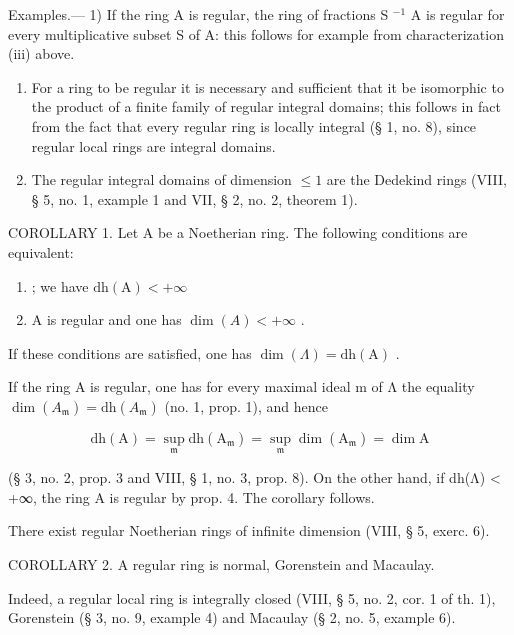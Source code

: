 Examples.--- 1) If the ring A is regular, the ring of fractions S \(^{-1}\) A is regular for every multiplicative subset S of A: this follows for example from characterization (iii) above.

\begin{enumerate}
\def\labelenumi{\arabic{enumi})}
\setcounter{enumi}{1}
\item
  For a ring to be regular it is necessary and sufficient that it be isomorphic to the product of a finite family of regular integral domains; this follows in fact from the fact that every regular ring is locally integral (§ 1, no. 8), since regular local rings are integral domains.
\item
  The regular integral domains of dimension \(\leqslant 1\) are the Dedekind rings (VIII, § 5, no. 1, example 1 and VII, § 2, no. 2, theorem 1).
\end{enumerate}

COROLLARY 1. Let A be a Noetherian ring. The following conditions are equivalent:

\begin{enumerate}
\def\labelenumi{(\roman{enumi})}
\item
  ; we have \(\mathrm{dh(A)} < +\infty\)
\item
  A is regular and one has \(\dim(A) < +\infty\) .
\end{enumerate}

If these conditions are satisfied, one has \(\dim(\Lambda) = \mathrm{d}\mathrm{h}(\mathrm{A})\) .

If the ring A is regular, one has for every maximal ideal m of Λ the equality \(\dim(A_{\mathfrak{m}}) = \mathrm{dh}(A_{\mathfrak{m}})\) (no. 1, prop. 1), and hence

\[
\mathrm{dh} (\mathrm{A}) = \sup _ {\mathfrak {m}} \mathrm{dh} (\mathrm{A} _ {\mathfrak {m}}) = \sup _ {\mathfrak {m}} \dim (\mathrm{A} _ {\mathfrak {m}}) = \dim \mathrm{A}
\]

(§ 3, no. 2, prop. 3 and VIII, § 1, no. 3, prop. 8). On the other hand, if dh(Λ) \textless{} +∞, the ring A is regular by prop. 4. The corollary follows.

There exist regular Noetherian rings of infinite dimension (VIII, § 5, exerc. 6).

COROLLARY 2. A regular ring is normal, Gorenstein and Macaulay.

Indeed, a regular local ring is integrally closed (VIII, § 5, no. 2, cor. 1 of th. 1), Gorenstein (§ 3, no. 9, example 4) and Macaulay (§ 2, no. 5, example 6).

